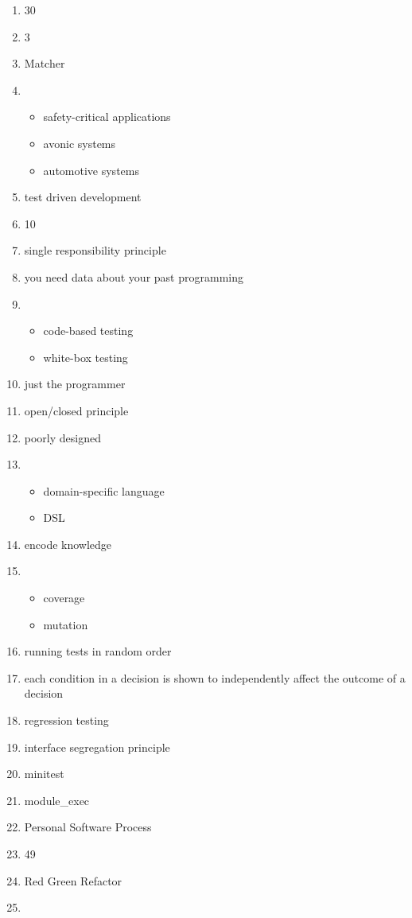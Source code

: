\documentclass{exam}
\begin{document}
\begin{enumerate}
\item 30
\item 3
\item Matcher
\item \begin{itemize}
\item safety-critical applications
\item avonic systems
\item automotive systems
\end{itemize}
\item test driven development
\item 10
\item single responsibility principle
\item you need data about your past programming
\item \begin{itemize}
\item code-based testing
\item white-box testing
\end{itemize}
\item just the programmer
\item open/closed principle
\item poorly designed
\item \begin{itemize}
\item domain-specific language
\item DSL
\end{itemize}
\item encode knowledge
\item \begin{itemize}
\item coverage
\item mutation
\end{itemize}
\item running tests in random order
\item each condition in a decision is shown to independently affect the outcome of a decision
\item regression testing
\item interface segregation principle
\item minitest
\item module\_exec
\item Personal Software Process
\item 49
\item Red Green Refactor
\item \begin{itemize}

\end{itemize}
\end{enumerate}
\end{document}
